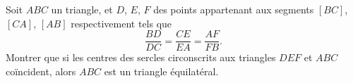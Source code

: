\documentclass[varwidth]{standalone}
\begin{document}
    Soit $ABC$ un triangle, et $D$, $E$, $F$ des points appartenant aux segments $[BC]$, $[CA]$, $[AB]$ respectivement tels que
    \[
        \frac{BD}{DC} = \frac{CE}{EA} = \frac{AF}{FB}.  
    \]
    Montrer que si les centres des sercles circonscrits aux triangles $DEF$ et $ABC$ co\"incident, alors $ABC$ est un triangle \'equilat\'eral.
\end{document}
